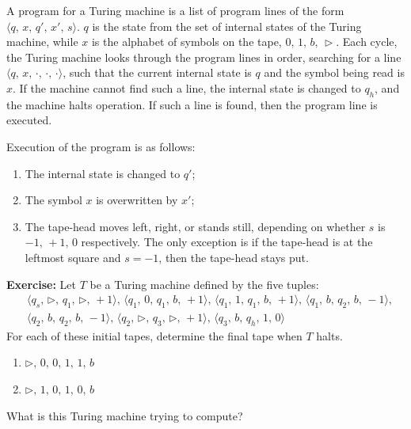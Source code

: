 \documentclass{beamer}
\begin{document}
\begin{frame}
\justify
A program for a Turing machine is a list of program lines of the form $\langle q,\,x,\,q',\,x',\,s \rangle$.
\vfill
$q$ is the state from the set of internal states of the Turing machine, while $x$ is the alphabet of symbols on the tape, $0,\,1,\,b,\,\triangleright$.
\vfill
Each cycle, the Turing machine looks through the program lines in order, searching for a line $\langle q,\,x,\,\cdot,\,\cdot,\,\cdot \rangle$, such that the current internal state is $q$ and the symbol being read is $x$.
\vfill
If the machine cannot find such a line, the internal state is changed to $q_h$, and the machine halts operation.
\vfill
If such a line is found, then the program line is executed.
\end{frame}

\begin{frame}
\justify
Execution of the program is as follows:
\begin{enumerate}
\item The internal state is changed to $q'$;
\item The symbol $x$ is overwritten by $x'$;
\item The tape-head moves left, right, or stands still, depending on whether $s$ is $-1,\,+1,\,0$ respectively. The only exception is if the tape-head is at the leftmost square and $s=-1$, then the tape-head stays put.
\end{enumerate}
\vfill
\textbf{Exercise:} Let $T$ be a Turing machine defined by the five tuples:
\begin{align*}
& \langle q_s,\,\triangleright,\,q_1,\,\triangleright,\,+1 \rangle,\, \langle q_1,\,0,\,q_1,\,b,\,+1 \rangle,\, \langle q_1,\,1,\,q_1,\,b,\,+1 \rangle,\, \langle q_1,\,b,\,q_2,\,b,\,-1 \rangle,\\ & \langle q_2,\,b,\,q_2,\,b,\,-1 \rangle,\, \langle q_2,\,\triangleright,\,q_3,\,\triangleright,\,+1 \rangle,\, \langle q_3,\,b,\,q_h,\,1,\,0 \rangle
\end{align*}
For each of these initial tapes, determine the final tape when $T$ halts.
\begin{enumerate}
\item $\triangleright,\, 0,\, 0,\, 1,\, 1,\, b$
\item $\triangleright,\, 1,\, 0,\, 1,\, 0,\, b$
\end{enumerate}
What is this Turing machine trying to compute?
\end{frame}
\end{document}
